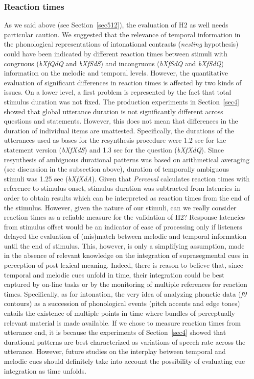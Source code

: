 \subsubsection{Reaction times}\label{sec5412}
As we said above (see Section~\ref{sec512}), the evaluation of H2 as well needs particular caution. We suggested that the relevance of temporal information in the phonological representations of intonational contrasts (\textit{nesting} hypothesis) could have been indicated by different reaction times between stimuli with congruous (\textit{bXfQdQ} and \textit{bXfSdS}) and incongruous (\textit{bXfSdQ} and \textit{bXfSdQ}) information on the melodic and temporal levels. However, the quantitative evaluation of significant differences in reaction times is affected by two kinds of issues.
On a lower level, a first problem is represented by the fact that total stimulus duration was not fixed. The production experiments in Section~\ref{sec4} showed that global utterance duration is not significantly different across questions and statements. However, this does not mean that differences in the duration of individual items are unattested. Specifically, the durations of the utterances used as bases for the resynthesis procedure were 1.2 sec for the statement version (\textit{bXfXdS}) and 1.3 sec for the question (\textit{bXfXdQ}). Since resynthesis of ambiguous durational patterns was based on arithmetical averaging (see discussion in the subsection above), duration of temporally ambiguous stimuli was 1.25 sec (\textit{bXfXdA}). Given that \textit{Perceval} calculates reaction times with reference to stimulus onset, stimulus duration was subtracted from latencies in order to obtain results which can be interpreted as reaction times from the end of the stimulus.
However, given the nature of our stimuli, can we really consider reaction times as a reliable measure for the validation of H2? Response latencies from stimulus offset would be an indicator of ease of processing only if listeners delayed the evaluation of (mis)match between melodic and temporal information until the end of stimulus. This, however, is only a simplifying assumption, made in the absence of relevant knowledge on the integration of suprasegmental cues in perception of post-lexical meaning. Indeed, there is reason to believe that, since temporal and melodic cues unfold in time, their integration could be best captured by on-line tasks or by the monitoring of multiple references for reaction times. Specifically, as for intonation, the very idea of analyzing phonetic data (\textit{f0} contours) as a succession of phonological events (pitch accents and edge tones) entails the existence of multiple points in time where bundles of perceptually relevant material is made available. If we chose to measure reaction times from utterance end, it is because the experiments of Section~\ref{sec4} showed that durational patterns are best characterized as variations of speech rate across the utterance. However, future studies on the interplay between temporal and melodic cues should definitely take into account the possibility of evaluating cue integration as time unfolds.
